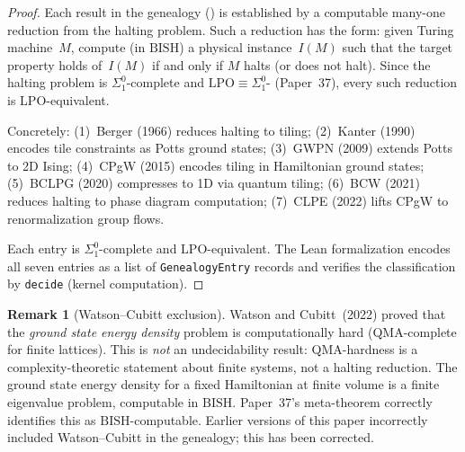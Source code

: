 \documentclass[11pt,a4paper]{article}
\theoremstyle{plain}
\theoremstyle{definition}
\newtheorem{remark}[theorem]{Remark}
\newcommand{\LPO}{\ensuremath{\mathrm{LPO}}}
\newcommand{\BISH}{\ensuremath{\mathrm{BISH}}}
\begin{document}
\begin{proof}
Each result in the genealogy () is established
by a computable many-one reduction from the halting problem.
Such a reduction has the form:
given Turing machine~$M$, compute (in $\BISH$) a physical
instance~$I(M)$ such that the target property holds of~$I(M)$
if and only if $M$ halts (or does not halt).
Since the halting problem is $\Sigma_1^0$-complete and
$\LPO \equiv \Sigma_1^0$- (Paper~37), every
such reduction is \LPO-equivalent.

Concretely: (1)~Berger (1966) reduces halting to tiling;
(2)~Kanter (1990) encodes tile constraints as Potts ground states;
(3)~GWPN (2009) extends Potts to 2D Ising;
(4)~CPgW (2015) encodes tiling in Hamiltonian ground states;
(5)~BCLPG (2020) compresses to 1D via quantum tiling;
(6)~BCW (2021) reduces halting to phase diagram computation;
(7)~CLPE (2022) lifts CPgW to renormalization group flows.

Each entry is $\Sigma_1^0$-complete and \LPO-equivalent.
The Lean formalization encodes all seven entries as a list of
\texttt{GenealogyEntry} records and verifies the classification
by \texttt{decide} (kernel computation).
\end{proof}

\begin{remark}[Watson--Cubitt exclusion]\label{rem:wc-exclusion}
Watson and Cubitt~(2022) proved that the \emph{ground state energy density}
problem is computationally hard (QMA-complete for finite lattices).
This is \emph{not} an undecidability result: QMA-hardness is a
complexity-theoretic statement about finite systems, not a halting
reduction.  The ground state energy density for a fixed Hamiltonian
at finite volume is a finite eigenvalue problem, computable in
$\BISH$.  Paper~37's meta-theorem correctly identifies this as
$\BISH$-computable.  Earlier versions of this paper incorrectly
included Watson--Cubitt in the genealogy; this has been corrected.
\end{remark}
\end{document}
